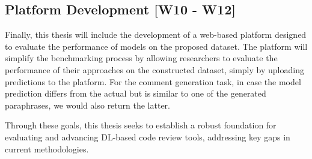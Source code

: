 \subsection{Platform Development [W10 - W12]}

Finally, this thesis will include the development
of a web-based platform designed to evaluate the performance of models on
the proposed dataset. The platform will simplify the benchmarking process by allowing researchers to evaluate the performance of their approaches on the constructed dataset, simply by uploading predictions to the platform.
For the comment generation task, in case the model prediction differs from the actual \revComment but is similar to one of the generated paraphrases, we would also return the latter.



Through these goals, this thesis seeks to establish a robust foundation for
evaluating and advancing DL-based code review tools, addressing key gaps in
current methodologies.
